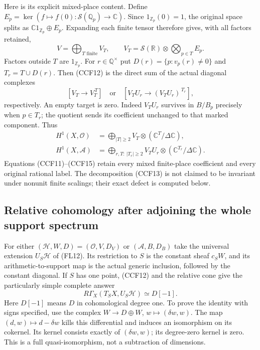 Here is its explicit mixed-place content. Define
$E_p=\ker(f\mapsto f(0):\mathcal S(\mathbb Q_p)\to\mathbb C)$.
Since $1_{\mathbb Z_p}(0)=1$, the original space splits as
$\mathbb C1_{\mathbb Z_p}\oplus E_p$. Expanding each finite
tensor therefore gives, with all factors retained,
\[
 V=\bigoplus_{T\text{ finite}}V_T,\qquad
 V_T=\mathcal S(\mathbb R)\otimes\bigotimes_{p\in T}E_p.
 \tag{CCF13}
\]
Factors outside $T$ are $1_{\mathbb Z_p}$. For $r\in\mathbb Q^\times$
put $D(r)=\{p:v_p(r)\ne0\}$ and $T_r=T\cup D(r)$. Then (CCF12)
is the direct sum of the actual diagonal complexes
\[
 [V_T\longrightarrow V_T^{\,T}]
 \quad\text{or}\quad
 [V_TU_r\longrightarrow (V_TU_r)^{\,T_r}],
 \tag{CCF14}
\]
respectively. An empty target is zero. Indeed $V_TU_r$ survives
in $B/B_p$ precisely when $p\in T_r$; the quotient sends its
coefficient unchanged to that marked component. Thus
\[
 \begin{aligned}
 H^1(X,\mathcal O)&=\bigoplus_{|T|\ge2}
       V_T\otimes(\mathbb C^T/\Delta\mathbb C),\\
 H^1(X,\mathcal A)&=\bigoplus_{r,T:\ |T_r|\ge2}
       V_TU_r\otimes(\mathbb C^{T_r}/\Delta\mathbb C).
 \end{aligned}
 \tag{CCF15}
\]
Equations (CCF11)--(CCF15) retain every mixed finite-place
coefficient and every original rational label. The decomposition
(CCF13) is not claimed to be invariant under nonunit finite
scalings; their exact defect is computed below.

\subsection{Relative cohomology after adjoining the whole support spectrum}

For either $(\mathcal H,W,D)=(\mathcal O,V,D_V)$ or
$(\mathcal A,B,D_B)$ take the universal extension $U_S\mathcal H$
of (FL12). Its restriction to $S$ is the constant sheaf $c_SW$,
and its arithmetic-to-support map is the actual generic
inclusion, followed by the constant diagonal. If $S$ has one
point, (CCF12) and the relative cone give the particularly
simple complete answer
\[
 R\Gamma_X(T_SX,U_S\mathcal H)\simeq D[-1].
 \tag{CCF16}
\]
Here $D[-1]$ means $D$ in cohomological degree one. To prove the
identity with signs specified, use the complex
$W\to D\oplus W$, $w\mapsto(\delta w,w)$.
The map $(d,w)\mapsto d-\delta w$ kills this differential and
induces an isomorphism on its cokernel. Its kernel consists
exactly of $(\delta w,w)$; its degree-zero kernel is zero.
This is a full quasi-isomorphism, not a subtraction of dimensions.

